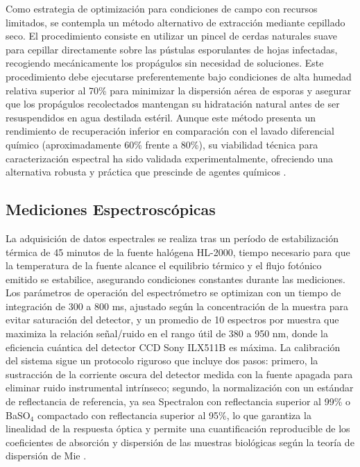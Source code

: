 \documentclass[12pt, a4paper]{article}
\begin{document}
	Como estrategia de optimización para condiciones de campo con recursos limitados, se contempla un método alternativo de extracción mediante cepillado seco. El procedimiento consiste en utilizar un pincel de cerdas naturales suave para cepillar directamente sobre las pústulas esporulantes de hojas infectadas, recogiendo mecánicamente los propágulos sin necesidad de soluciones. Este procedimiento debe ejecutarse preferentemente bajo condiciones de alta humedad relativa superior al 70\% para minimizar la dispersión aérea de esporas y asegurar que los propágulos recolectados mantengan su hidratación natural antes de ser resuspendidos en agua destilada estéril. Aunque este método presenta un rendimiento de recuperación inferior en comparación con el lavado diferencial químico (aproximadamente 60\% frente a 80\%), su viabilidad técnica para caracterización espectral ha sido validada experimentalmente, ofreciendo una alternativa robusta y práctica que prescinde de agentes químicos \parencite{Martins2021}.
	
	\subsection{Mediciones Espectroscópicas}
	
	La adquisición de datos espectrales se realiza tras un período de estabilización térmica de 45 minutos de la fuente halógena HL-2000, tiempo necesario para que la temperatura de la fuente alcance el equilibrio térmico y el flujo fotónico emitido se estabilice, asegurando condiciones constantes durante las mediciones. Los parámetros de operación del espectrómetro se optimizan con un tiempo de integración de 300 a 800 ms, ajustado según la concentración de la muestra para evitar saturación del detector, y un promedio de 10 espectros por muestra que maximiza la relación señal/ruido en el rango útil de 380 a 950 nm, donde la eficiencia cuántica del detector CCD Sony ILX511B es máxima. La calibración del sistema sigue un protocolo riguroso que incluye dos pasos: primero, la sustracción de la corriente oscura del detector medida con la fuente apagada para eliminar ruido instrumental intrínseco; segundo, la normalización con un estándar de reflectancia de referencia, ya sea Spectralon con reflectancia superior al 99\% o BaSO$_4$ compactado con reflectancia superior al 95\%, lo que garantiza la linealidad de la respuesta óptica y permite una cuantificación reproducible de los coeficientes de absorción y dispersión de las muestras biológicas según la teoría de dispersión de Mie \parencite{bohren1983}.
	
\end{document}
